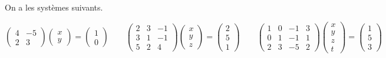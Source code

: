 \documentclass[11pt,fleqn]{book} %
\begin{document}
\begin{solution}
On a les systèmes suivants.

$\begin{pmatrix}4&-5\\2&3\end{pmatrix}\begin{pmatrix}x\\y\end{pmatrix}=\begin{pmatrix}
1\\0\end{pmatrix}\qquad \begin{pmatrix}
2&3&-1\\3&1&-1\\5&2&4\end{pmatrix}\begin{pmatrix}x\\y\\z\end{pmatrix}=\begin{pmatrix}2\\5\\1\end{pmatrix}\qquad \begin{pmatrix}1&0&-1&3\\0&1&-1&1\\2&3&-5&2\end{pmatrix}\begin{pmatrix}x\\y\\z\\t\end{pmatrix}=\begin{pmatrix}1\\5\\3\end{pmatrix}$
\end{solution}
\end{document}
